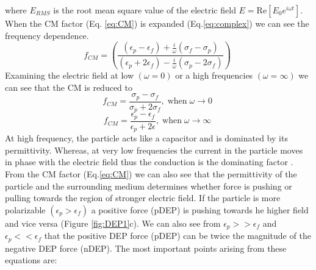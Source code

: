 \documentclass[final]{jyflluk}
\begin{document}
%
where $E_{RMS}$ is the root mean square value of the electric field $E=\mathrm{Re}[E_0 e^{i \omega t}]$. When the CM factor (Eq. \ref{eq:CM})  is expanded (Eq.\ref{eq:complex}) we can see the frequency dependence.
%
\begin{equation}
   \label{eq:CM_open}
   f_{CM} = \left(\frac{(\epsilon_{p} - \epsilon_{f}) + \frac{i}{\omega} (\sigma_f - \sigma_p)}
   {(\epsilon_{p} + 2\epsilon_{f}) - \frac{i}{\omega} (\sigma_p - 2\sigma_f)} \right)\;
\end{equation}
%
Examining the electric field at low  $(\omega = 0)$ or a high frequencies $(\omega = \infty)$ we can see that the CM is reduced to 
\begin{equation}
   \label{eq:wat0}
   f_{CM} = \frac{\sigma_p - \sigma_f} {\sigma_p + 2\sigma_f}, \; \mathrm{when } \;\omega \rightarrow 0 \;
\end{equation}
\begin{equation}
   \label{eq:watinf}
   f_{CM} = \frac{\epsilon_p - \epsilon_f} {\epsilon_p + 2\epsilon}, \;\mathrm{when } \;\omega \rightarrow \infty\;
\end{equation}
At high frequency, the particle acts like a capacitor and is dominated by its permittivity. Whereas, at very low frequencies the current in the particle moves in phase with the electric field thus the conduction is the dominating factor \cite{cetin_dielectrophoresis_2011, li_review_2014, pethig_review_2010}. 
From the CM factor (Eq.\ref{eq:CM}) we can also see that the permittivity of the particle and the surrounding medium determines whether force is pushing or pulling towards the region of stronger electric field. If the particle is more polarizable $(\epsilon_p>\epsilon_f)$ a positive force (pDEP) is pushing towards he higher field and vice versa (Figure \ref{fig:DEP1}c). We can also see from $\epsilon_p>>\epsilon_f$ and  $\epsilon_p<<\epsilon_f $ that the positive DEP force (pDEP) can be twice the magnitude of the negative DEP force (nDEP).
The most important points arising from these equations are:
\end{document}
